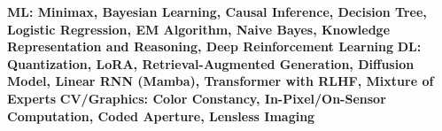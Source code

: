 \textbf{ML: Minimax, Bayesian Learning, Causal Inference, Decision Tree, Logistic Regression, EM Algorithm, Naive Bayes, Knowledge Representation and Reasoning, Deep Reinforcement Learning}
\textbf{DL: Quantization, LoRA, Retrieval-Augmented Generation, Diffusion Model, Linear RNN (Mamba), Transformer with RLHF, Mixture of Experts}
\textbf{CV/Graphics: Color Constancy, In-Pixel/On-Sensor Computation, Coded Aperture, Lensless Imaging}